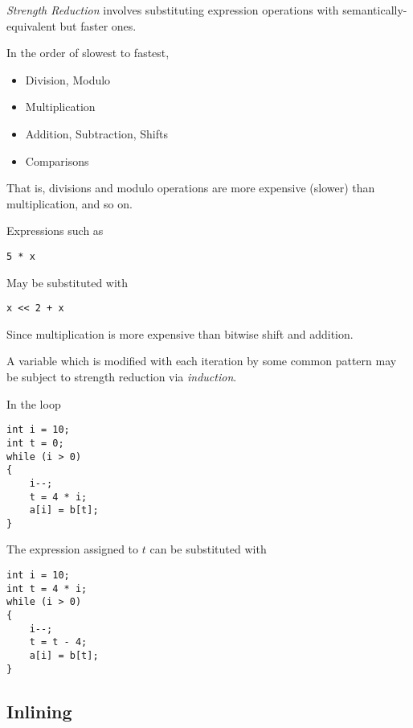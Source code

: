 \begin{definition}
    \textit{Strength Reduction} involves substituting expression operations with semantically-equivalent but faster ones.
    
    In the order of slowest to fastest,
    \begin{itemize}
        \item Division, Modulo
        \item Multiplication
        \item Addition, Subtraction, Shifts
        \item Comparisons
    \end{itemize}
    
    That is, divisions and modulo operations are more expensive (slower) than multiplication, and so on.
\end{definition}

\begin{example}
    Expressions such as
    \begin{verbatim}
5 * x
    \end{verbatim}
    
    May be substituted with
    \begin{verbatim}
x << 2 + x
    \end{verbatim}
    
    Since multiplication is more expensive than bitwise shift and addition.
\end{example}

\begin{definition}
    A variable which is modified with each iteration by some common pattern may be subject to strength reduction via \textit{induction}.
\end{definition}

\begin{example}
    In the loop
    \begin{verbatim}
int i = 10;
int t = 0;
while (i > 0)
{
    i--;
    t = 4 * i;
    a[i] = b[t];
}
    \end{verbatim}
    
    The expression assigned to $t$ can be substituted with
        \begin{verbatim}
int i = 10;
int t = 4 * i;
while (i > 0)
{
    i--;
    t = t - 4;
    a[i] = b[t];
}
    \end{verbatim}
\end{example}

\subsection{Inlining}

